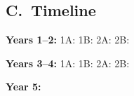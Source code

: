 
\subsection{C.\fi\ Timeline}\label{c.timeline}

\textbf{Years 1--2:}
1A: %
1B: %
2A: %
2B: %

\textbf{Years 3--4:}
1A: %
1B: %
2A: %
2B: %

\textbf{Year 5:}
